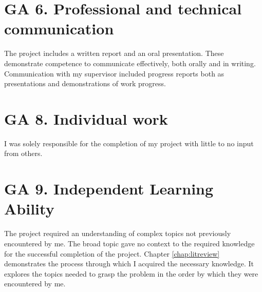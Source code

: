 \section{GA 6. Professional and technical communication}
The project includes a written report and an oral presentation. These demonstrate competence to communicate effectively, both orally and in writing. Communication with my supervisor included progress reports both as presentations and demonstrations of work progress.

\section{GA 8. Individual work}
I was solely responsible for the completion of my project with little to no input from others. 

\section{GA 9. Independent Learning Ability}
The project required an understanding of complex topics not previously encountered by me. The broad topic gave no context to the required knowledge for the successful completion of the project. Chapter \ref{chap:litreview} demonstrates the process through which I acquired the necessary knowledge. It explores the topics needed to grasp the problem in the order by which they were encountered by me.  